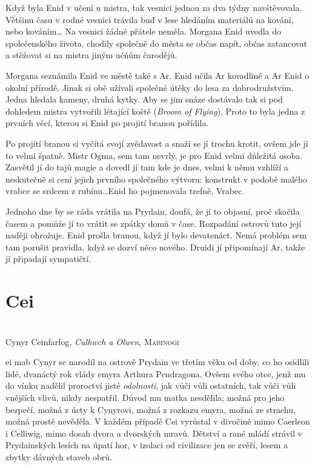 \documentclass[a4paper,twocolumn,openany,nodeprecatedcode, justified]{dndbook}
\begin{document}
	Když byla Enid v učení u mistra, tak vesnici jednou za dva týdny navštěvovala. Většinu času v rodné vesnici trávila buď v lese hledáním materiálů na kování, nebo kováním… Na vesnici žádné přátele neměla. Morgana Enid uvedla do společenského života, chodily společně do města se občas napít, občas zatancovat a stěžovat si na mistra jiným učňům čarodějů.
	
	Morgana seznámila Enid ve městě také s Ar. Enid učila Ar kovadlině a Ar Enid o okolní přírodě. Jinak si obě užívali společné útěky do lesa za dobrodružstvím. Jedna hledala kameny, druhá kytky. Aby se jim snáze dostávalo tak si pod dohledem mistra vytvořili létající koště (\emph{Broom of Flying}). Proto to byla jedna z prvních věcí, kterou si Enid po projití branou pořídila.
	
	Po projití branou si vyčítá svojí zvědavost a snaží se jí trochu krotit, ovšem jde jí to velmi špatně.  Mistr Ogma, sem tam nevrlý, je pro Enid velmi důležitá osoba. Zasvětil jí do tajů magie a dovedl jí tam kde je dnes, velmi k němu vzhlíží a neskutečně si cení jejich prvního společného výtvoru: konstrukt v podobě malého vrabce se srdcem z rubínu…Enid ho pojmenovala trefně, Vrabec.
	
	Jednoho dne by se ráda vrátila na Prydain, doufá, že jí to objasní, proč skočila časem a pomůže jí to vrátit se zpátky domů v čase. Rozpadání ostrovů tuto její naději ohrožuje. Enid prošla branou, když jí bylo devatenáct. Nemá problém sem tam porušit pravidla, když se dozví něco nového. Druidi jí připomínají Ar, takže jí připadají sympatičtí.
	
	
	
	
	
	
	
	\chapter{Cei}
	\begin{DndReadAloud}
		\sffamily
		\raggedright
		\\
		\raggedleft Cynyr Ceinfarfog, \emph{Culhwch a Olwen}, \textsc{Mabinogi}
	\end{DndReadAloud}
	
	ei mab Cynyr se narodil na ostrově Prydain ve třetím věku od doby, co ho osídlili lidé, dvanáctý rok vlády emyra Arthura Pendragona. Ovšem svého otce, jenž mu do vínku nadělil proroctví jisté \emph{odolnosti}, jak vůči vůli ostatních, tak vůči vůli vnějších vlivů, nikdy nespatřil. Důvod mu matka nesdělila; možná pro jeho bezpečí, možná z úcty k Cynyrovi, možná z rozkazu emyra, možná ze strachu, možná prostě nevěděla. V každém případě Cei vyrůstal v divočině mimo Caerleon i Celliwig, mimo dosah dvora a dvorských mravů. Dětství a rané mládí strávil v Prydainských lesích na úpatí hor, v izolaci od civilizace jen se zvěří, lesem a zbytky dávných staveb obrů. \\
	
\end{document}
